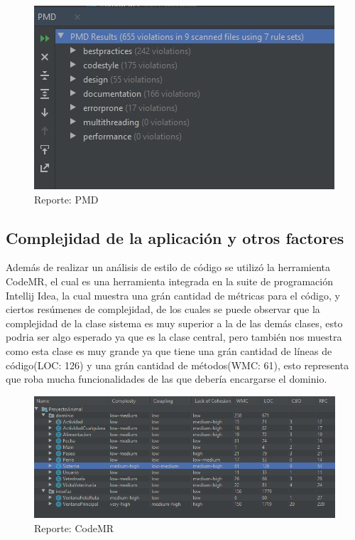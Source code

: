 \begin{figure}[H]
    \centering
    \includegraphics[scale =3]{Files/analisisPMD.jpg}
    \caption{Reporte: PMD}
    \label{fig:PMD}
\end{figure}

\subsection{Complejidad de la aplicación y otros factores}
Además de realizar un análisis de estilo de código se utilizó la herramienta CodeMR, el cual es una herramienta integrada en la suite de programación Intellij Idea, la cual muestra una grán cantidad de métricas para el código, y ciertos resúmenes de complejidad, de los cuales se puede observar que la complejidad de la clase sistema es muy superior a la de las demás clases, esto podria ser algo esperado ya que es la clase central, pero también nos muestra como esta clase es muy grande ya que tiene una grán cantidad de líneas de código(LOC: 126) y una grán cantidad de métodos(WMC: 61), esto representa que roba mucha funcionalidades de las que debería encargarse el dominio.
\begin{figure}[H]
    \centering
    \includegraphics[scale =0.5]{Files/codeMR.png}
    \caption{Reporte: CodeMR}
    \label{fig:MR}
\end{figure}

